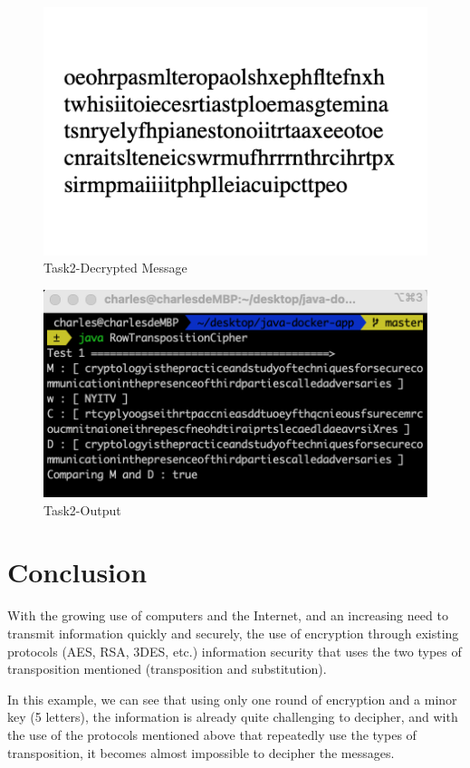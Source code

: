 \documentclass[twoside,twocolumn]{article}
\begin{document}
\begin{figure}[H]
  \centering
  \includegraphics[scale=0.75]{./Graphs/Figure1.9.png}
  \caption{Task2-Decrypted Message}
  \label{fig:testfig1}
\end{figure}
\begin{figure}[H]
  \centering
  \includegraphics[scale=0.45]{./Graphs/Figure1.6.png}
  \caption{Task2-Output}
  \label{fig:testfig1}
\end{figure}

\section{Conclusion}

With the growing use of computers and the Internet, and an increasing need to transmit information quickly and securely, the use of encryption through existing protocols (AES, RSA, 3DES, etc.) information security that uses the two types of transposition mentioned (transposition and substitution).

In this example, we can see that using only one round of encryption and a minor key (5 letters), the information is already quite challenging to decipher, and with the use of the protocols mentioned above that repeatedly use the types of transposition, it becomes almost impossible to decipher the messages.
\end{document}
